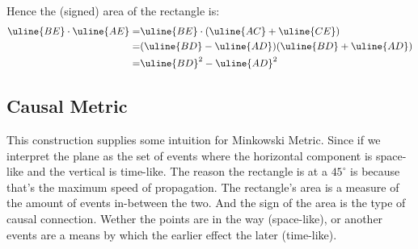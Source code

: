 Hence the (signed) area of the rectangle is:
\begin{equation*}
\begin{aligned}
	\uline{BE}\cdot\uline{AE} =&\uline{BE}\cdot(\uline{AC}+\uline{CE}) \\
	=&(\uline{BD}-\uline{AD})(\uline{BD}+\uline{AD})\\
	=&\uline{BD}^2-\uline{AD}^2\\
\end{aligned}
\end{equation*}

\subsection{Causal Metric}
This construction supplies some intuition for Minkowski Metric.
Since if we interpret the plane as the set of events where the horizontal component is space-like and the vertical is time-like.
The reason the rectangle is at a $45^\circ$ is because that's the maximum speed of propagation.
The rectangle's area is a measure of the amount of events in-between the two.
And the sign of the area is the type of causal connection.
Wether the points are in the way (space-like), or another events are a means by which the earlier effect the later (time-like).

\let\uline\undefined

